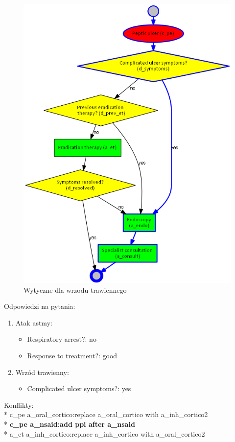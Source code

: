 \newpage
\begin{figure}[H]
\centering
\includegraphics[scale=0.5]{img/peptic-ulcer.png}
\caption{Wytyczne dla wrzodu trawiennego}
\label{fig:pu}
\end{figure}
\newpage
\noindent Odpowiedzi na pytania:
\begin{enumerate}
\item{Atak astmy:
	\begin{itemize}
	\item{Respiratory arrest?: no}
	\item{Response to treatment?: good}
	\end{itemize}
}
\item{Wrzód trawienny:
	\begin{itemize}
	\item{Complicated ulcer symptoms?: yes}
	\end{itemize}
}
\end{enumerate}
Konflikty:\\*
c\_pe a\_oral\_cortico:replace a\_oral\_cortico with a\_inh\_cortico2\\*
\textbf{c\_pe a\_nsaid:add ppi after a\_nsaid}\\*
a\_et a\_inh\_cortico:replace a\_inh\_cortico with a\_oral\_cortico2

